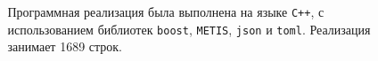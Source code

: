 \begin{frame}
\begin{columns}
\begin{column}{0.5\textwidth}
\begin{figure}
                \label{fig:UML}
            \end{figure}
        \end{column}
        \begin{column}{0.5\textwidth}
            Программная реализация была выполнена на языке \texttt{C++}, с использованием библиотек \texttt{boost}, \texttt{METIS}, \texttt{json} и \texttt{toml}. Реализация занимает 1689 строк.
        \end{column}
    \end{columns}
\end{frame}

